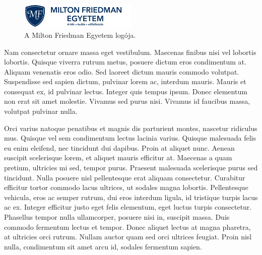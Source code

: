 \documentclass[a4paper,12pt]{article} %
\begin{document}
\begin{figure}[t]
\begin{center}
\includegraphics[width=0.5\textwidth]{MFE.png}
\caption{A Milton Friedman Egyetem logója.} \label{fig:mfe}
\end{center}
\end{figure}

Nam consectetur ornare massa eget vestibulum. Maecenas finibus nisi vel lobortis lobortis. Quisque viverra rutrum metus, posuere dictum eros condimentum at. Aliquam venenatis eros odio. Sed laoreet dictum mauris commodo volutpat. Suspendisse sed sapien dictum, pulvinar lorem ac, interdum mauris. Mauris et consequat ex, id pulvinar lectus. Integer quis tempus ipsum. Donec elementum non erat sit amet molestie. Vivamus sed purus nisi. Vivamus id faucibus massa, volutpat pulvinar nulla.

Orci varius natoque penatibus et magnis dis parturient montes, nascetur ridiculus mus. Quisque vel sem condimentum lectus lacinia varius. Quisque malesuada felis eu enim eleifend, nec tincidunt dui dapibus. Proin at aliquet nunc. Aenean suscipit scelerisque lorem, et aliquet mauris efficitur at. Maecenas a quam pretium, ultricies mi sed, tempor purus. Praesent malesuada scelerisque purus sed tincidunt. Nulla posuere nisl pellentesque erat aliquam consectetur. Curabitur efficitur tortor commodo lacus ultrices, ut sodales magna lobortis. Pellentesque vehicula, eros ac semper rutrum, dui eros interdum ligula, id tristique turpis lacus ac ex. Integer efficitur justo eget felis elementum, eget luctus turpis consectetur. Phasellus tempor nulla ullamcorper, posuere nisi in, suscipit massa. Duis commodo fermentum lectus et tempor. Donec aliquet lectus at magna pharetra, at ultricies orci rutrum. Nullam auctor quam sed orci ultrices feugiat. Proin nisl nulla, condimentum sit amet arcu id, sodales fermentum sapien.
\end{document}

